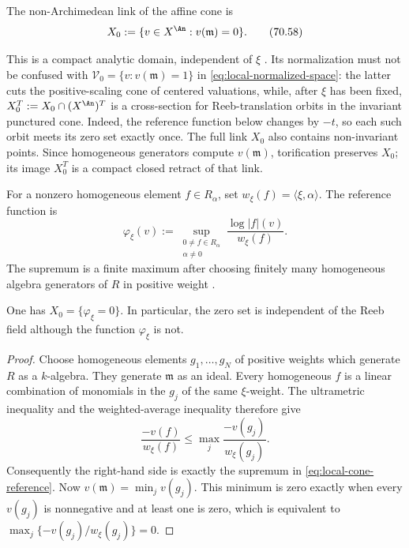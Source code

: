 \begin{definition}
\label{def:local-cone-link}
The non-Archimedean link of the affine cone is
\[
                         X_0:=\{v\in X^{\An}:v(\mathfrak m)=0\}.
\tag{70.58}\label{eq:local-cone-link}
\]
\end{definition}

This is a compact analytic domain, independent of $\xi$
\cite[Introduction and Definition~2.6]{Wu24AffineCones}.  Its normalization must not be
confused with $\mathcal V_0=\{v:v(\mathfrak m)=1\}$ in
\eqref{eq:local-normalized-space}: the latter cuts the positive-scaling cone
of centered valuations, while, after $\xi$ has been fixed,
$X_0^T:=X_0\cap(X^{\An})^T$ is a cross-section for Reeb-translation
orbits in the invariant punctured cone.  Indeed, the reference function
below changes by $-t$, so each such orbit meets its zero set exactly once.
The full link $X_0$ also contains non-invariant points.  Since homogeneous
generators compute $v(\mathfrak m)$, torification preserves $X_0$;
its image $X_0^T$ is a compact closed retract of that link.

For a nonzero homogeneous element $f\in R_\alpha$, set
$w_\xi(f)=\langle\xi,\alpha\rangle$.  The reference function is
\[
 \varphi_\xi(v)
 :=\sup_{\substack{0\ne f\in R_\alpha\\ \alpha\ne0}}
             \frac{\log|f|(v)}{w_\xi(f)}.
\tag{70.59}\label{eq:local-cone-reference}
\]
The supremum is a finite maximum after choosing finitely many homogeneous
algebra generators of $R$ in positive weight
\cite[Lemma~5.3]{Wu22AffineEnergy}.

\begin{lemma}
\label{lem:local-cone-reference-link}
One has $X_0=\{\varphi_\xi=0\}$.  In particular, the zero set is
independent of the Reeb field although the function $\varphi_\xi$ is not.
\end{lemma}

\begin{proof}
Choose homogeneous elements $g_1,\ldots,g_N$ of positive weights which
generate $R$ as a $k$-algebra.  They generate $\mathfrak m$ as an
ideal.  Every homogeneous $f$ is a linear combination of monomials in the
$g_j$ of the same $\xi$-weight.  The ultrametric inequality and the
weighted-average inequality therefore give
\[
 \frac{-v(f)}{w_\xi(f)}
 \leq \max_j\frac{-v(g_j)}{w_\xi(g_j)}.
\]
Consequently the right-hand side is exactly the supremum in
\eqref{eq:local-cone-reference}.  Now
$v(\mathfrak m)=\min_jv(g_j)$.  This minimum is zero exactly when every
$v(g_j)$ is nonnegative and at least one is zero, which is equivalent to
$\max_j\{-v(g_j)/w_\xi(g_j)\}=0$.
\end{proof}

